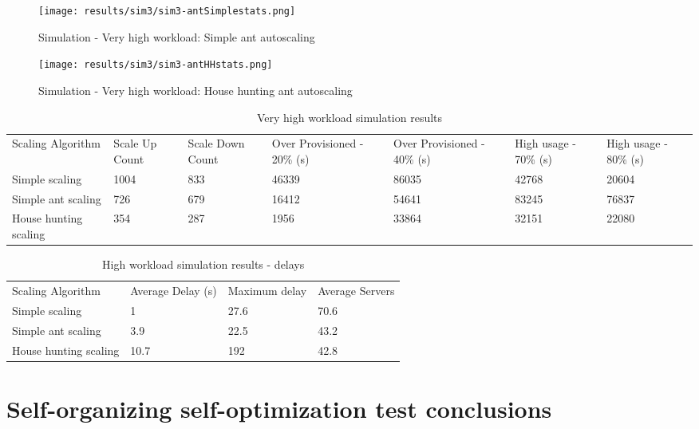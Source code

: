 \begin{figure}
	\centering
		\texttt{[image: results/sim3/sim3-antSimplestats.png]}
	\caption{Simulation - Very high workload: Simple ant autoscaling}
	\label{fig:sim3-antSimplestats}
\end{figure}

\begin{figure}
	\centering
		\texttt{[image: results/sim3/sim3-antHHstats.png]}
	\caption{Simulation - Very high workload: House hunting ant autoscaling}
	\label{fig:sim3-antHHstats}
\end{figure}

\begin{table}
\caption{Very high workload simulation results}
\label{table:sim3}
\begin{tabu} to\linewidth{|X[c]|X[c]|X[c]|X[c]|X[c]|X[c]|X[c]|}
\everyrow{\hline}
\hline
Scaling Algorithm & Scale Up Count & Scale Down Count & Over Provisioned - 20\% (s) & Over Provisioned - 40\% (s) & High usage - 70\% (s) & High usage - 80\% (s) \\
Simple scaling & 1004 & 833 & 46339 & 86035 & 42768 & 20604 \\
Simple ant scaling & 726 & 679 & 16412 & 54641 & 83245 & 76837 \\
House hunting scaling & 354 & 287 & 1956 & 33864 & 32151 & 22080 \\
\end{tabu}
\end{table}

\begin{table}
\caption{High workload simulation results - delays}
\label{table:sim3-delay}
\begin{tabu} to\linewidth{|X[c]|X[c]|X[c]|X[c]|}
\everyrow{\hline}
\hline
Scaling Algorithm & Average Delay (s) & Maximum delay & Average Servers  \\
Simple scaling & 1 & 27.6 & 70.6 \\
Simple ant scaling & 3.9 & 22.5 & 43.2 \\
House hunting scaling & 10.7 & 192 & 42.8 \\
\end{tabu}
\end{table}

\section{Self-organizing self-optimization test conclusions}

